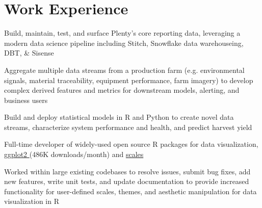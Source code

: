 \documentclass[]{deedy-resume-openfont}
\begin{document}
\hfill
\begin{minipage}[t]{0.66\textwidth} 


\section{Work Experience}

\vspace{\topsep} %
\begin{tightemize}
\item Build, maintain, test, and surface Plenty's core reporting data, leveraging a modern data science pipeline including Stitch, Snowflake data warehouseing, DBT, \& Sisense
\item Aggregate multiple data streams from a production farm (e.g. environmental signals, material traceability, equipment performance, farm imagery) to develop complex derived features and metrics for downstream models, alerting, and business users
\item Build and deploy statistical models in R and Python to create novel data streams, characterize system performance and health, and predict harvest yield
\end{tightemize}
\sectionsep

\vspace{\topsep} %
\begin{tightemize}
\item Full-time developer of widely-used open source R packages for data visualization, \href{https://github.com/tidyverse/ggplot2}{ggplot2 \faGithub{}} (486K downloads/month) and \href{https://github.com/r-lib/scales}{scales \faGithub}
\item Worked within large existing codebases to resolve issues, submit bug fixes, add new features, write unit tests, and update documentation to provide increased functionality for user-defined scales, themes, and aesthetic manipulation for data visualization in R
\end{tightemize}
\sectionsep


\end{minipage}
\end{document}
